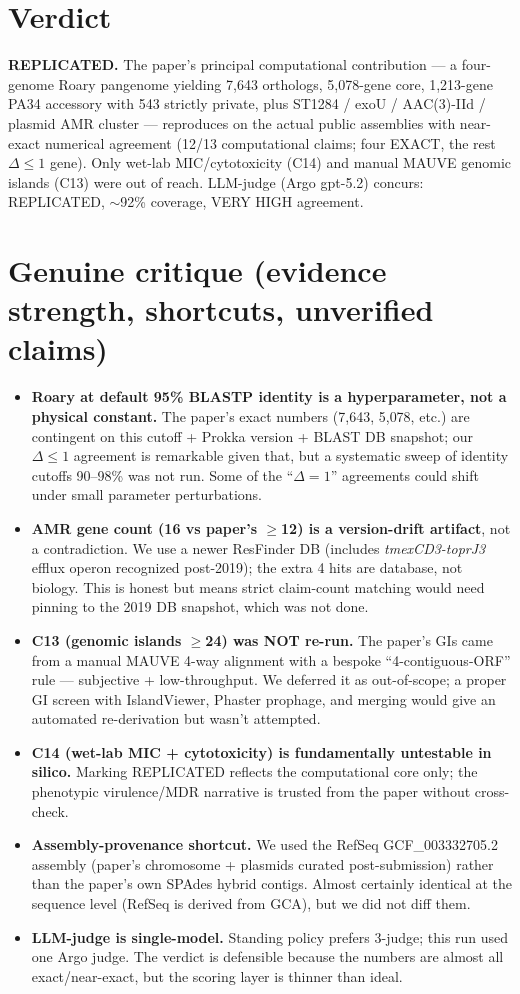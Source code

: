 \documentclass[11pt]{article}
\begin{document}
\section{Verdict}
\textbf{REPLICATED.} The paper's principal computational contribution --- a four-genome Roary
pangenome yielding 7{,}643 orthologs, 5{,}078-gene core, 1{,}213-gene PA34 accessory with 543
strictly private, plus ST1284 / exoU / AAC(3)-IId / plasmid AMR cluster --- reproduces on the
actual public assemblies with near-exact numerical agreement (12/13 computational claims;
four EXACT, the rest $\Delta{\leq}1$ gene). Only wet-lab MIC/cytotoxicity (C14) and manual
MAUVE genomic islands (C13) were out of reach. LLM-judge (Argo gpt-5.2) concurs: REPLICATED,
$\sim$92\% coverage, VERY HIGH agreement.

\section{Genuine critique (evidence strength, shortcuts, unverified claims)}
\begin{itemize}[leftmargin=1.4em]
\item \textbf{Roary at default 95\% BLASTP identity is a hyperparameter, not a physical
constant.} The paper's exact numbers (7{,}643, 5{,}078, etc.) are contingent on this cutoff +
Prokka version + BLAST DB snapshot; our $\Delta{\leq}1$ agreement is remarkable given that,
but a systematic sweep of identity cutoffs 90--98\% was not run. Some of the
``$\Delta=1$'' agreements could shift under small parameter perturbations.
\item \textbf{AMR gene count (16 vs paper's $\geq$12) is a version-drift artifact}, not a
contradiction. We use a newer ResFinder DB (includes \textit{tmexCD3-toprJ3} efflux operon
recognized post-2019); the extra 4 hits are database, not biology. This is honest but means
strict claim-count matching would need pinning to the 2019 DB snapshot, which was not done.
\item \textbf{C13 (genomic islands $\geq$24) was NOT re-run.} The paper's GIs came from a
manual MAUVE 4-way alignment with a bespoke ``4-contiguous-ORF'' rule --- subjective +
low-throughput. We deferred it as out-of-scope; a proper GI screen with IslandViewer,
Phaster prophage, and merging would give an automated re-derivation but wasn't attempted.
\item \textbf{C14 (wet-lab MIC + cytotoxicity) is fundamentally untestable in silico.}
Marking REPLICATED reflects the computational core only; the phenotypic virulence/MDR
narrative is trusted from the paper without cross-check.
\item \textbf{Assembly-provenance shortcut.} We used the RefSeq GCF\_003332705.2 assembly
(paper's chromosome + plasmids curated post-submission) rather than the paper's own SPAdes
hybrid contigs. Almost certainly identical at the sequence level (RefSeq is derived from
GCA), but we did not diff them.
\item \textbf{LLM-judge is single-model.} Standing policy prefers 3-judge; this run used one
Argo judge. The verdict is defensible because the numbers are almost all exact/near-exact,
but the scoring layer is thinner than ideal.
\end{itemize}
\end{document}
